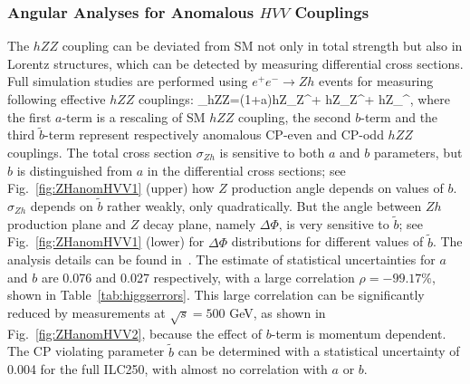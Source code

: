 \subsubsection{Angular Analyses for Anomalous $HVV$ Couplings}
The $hZZ$ coupling can be deviated from SM not only in total strength but also
in Lorentz structures, which can be detected by measuring differential cross sections.
Full simulation studies are performed using $e^+e^-\to Zh$ events 
for measuring following effective $hZZ$ couplings:
\beq
{}_{hZZ}=(1+a)hZ_\mu Z^\mu+
hZ_{\mu\nu}{Z}^{\mu\nu}+
hZ_{\mu\nu}^{\mu\nu},
where the first $a$-term is a rescaling of SM $hZZ$ coupling, the second $b$-term and 
the third $\tilde{b}$-term represent respectively anomalous CP-even and CP-odd 
$hZZ$ couplings. The total cross section $\sigma_{Zh}$ is sensitive to both $a$ and $b$
parameters, but $b$ is distinguished from $a$ in the differential cross sections; see
Fig.~\ref{fig:ZHanomHVV1} (upper) how $Z$ production angle depends on values of $b$.
$\sigma_{Zh}$ depends on $\tilde{b}$ rather weakly, only quadratically. But the angle 
between $Zh$ production plane and $Z$ decay plane, namely $\Delta\Phi$, is very
sensitive to $\tilde{b}$; see Fig.~\ref{fig:ZHanomHVV1} (lower) for $\Delta\Phi$ distributions for
different values of $\tilde{b}$. The analysis details can be found in~\cite{Ogawa:2017bmg}.
The estimate of statistical uncertainties for $a$ and $b$ are 
0.076 and 0.027 respectively, with a large correlation $\rho=-99.17\%$, 
shown in Table~\ref{tab:higgserrors}. This large correlation can be significantly reduced
by measurements at $\sqrt{s}=500$ GeV, as shown in Fig.~\ref{fig:ZHanomHVV2},
because the effect of $b$-term is momentum dependent.
The CP violating parameter $\tilde{b}$ can be determined with a statistical uncertainty of 
0.004 for the full ILC250, with almost no correlation with $a$ or $b$.
